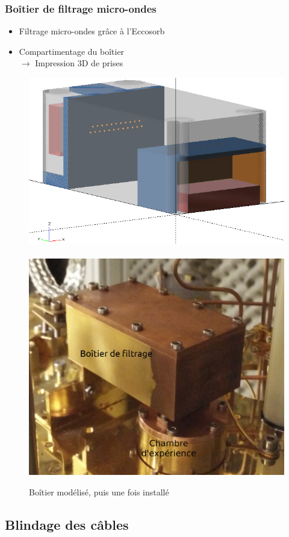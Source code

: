 \documentclass[10pt,a9paper,handout]{beamer} \usepackage[utf8]{inputenc} \usepackage[francais]{babel} \usepackage[T1]{fontenc}
\begin{document}
\begin{frame}
\frametitle{Boîtier de filtrage micro-ondes}

\begin{itemize}
    \item Filtrage micro-ondes grâce à l'Eccosorb
    \vspace*{2mm}
    \item Compartimentage du boîtier\\
    \hspace*{1cm} $\rightarrow$ Impression 3D de prises
\end{itemize}
\vspace*{3mm}
\begin{figure}[h]
    \centering
    \includegraphics[height=0.25\textwidth]{Images/Thermalisation/Filtrage3D}
    ~ 
    \includegraphics[height=0.25\textwidth]{Images/Thermalisation/Filtrage}
    \caption{Boîtier modélisé, puis une fois installé}
\end{figure}
\end{frame}

\subsection{Blindage des câbles}
\end{document}
